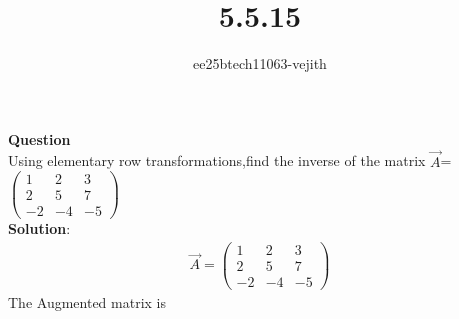 \documentclass[journal]{IEEEtran}
\begin{document}

\vspace{3cm}

\title{5.5.15}
\author{ee25btech11063-vejith}

\maketitle
{\let\newpage\relax\maketitle}
\renewcommand{\thefigure}{\theenumi}
\renewcommand{\thetable}{\theenumi}
\setlength{\intextsep}{10pt} %
\textbf{Question}\\
Using elementary row transformations,find the inverse of the matrix $\Vec{A}$=
$\begin{pmatrix}
        1 & 2 & 3 \\
        2 & 5 & 7 \\
        -2 & -4 & -5
    \end{pmatrix}$\\
\textbf{Solution}:\\
\begin{align}
    \Vec{A}=
\begin{pmatrix}
        1 & 2 & 3 \\
        2 & 5 & 7 \\
        -2 & -4 & -5
    \end{pmatrix}
\end{align}
The Augmented matrix is
\end{document}
